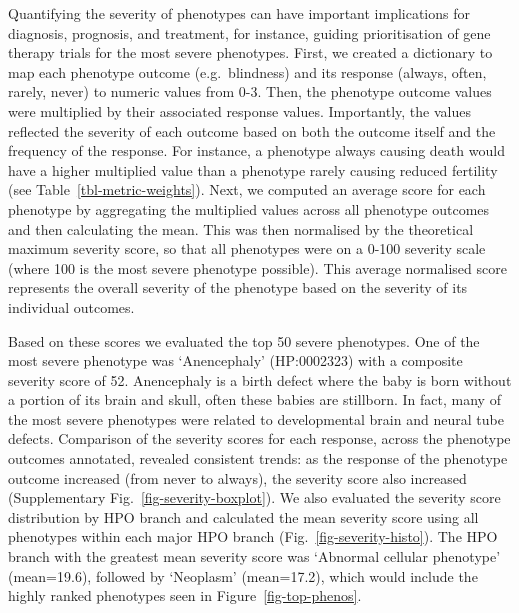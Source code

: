 \documentclass[
]{agujournal2019}
\begin{document}
Quantifying the severity of phenotypes can have important implications
for diagnosis, prognosis, and treatment, for instance, guiding
prioritisation of gene therapy trials for the most severe phenotypes.
First, we created a dictionary to map each phenotype outcome
(e.g.~blindness) and its response (always, often, rarely, never) to
numeric values from 0-3. Then, the phenotype outcome values were
multiplied by their associated response values. Importantly, the values
reflected the severity of each outcome based on both the outcome itself
and the frequency of the response. For instance, a phenotype always
causing death would have a higher multiplied value than a phenotype
rarely causing reduced fertility (see Table~\ref{tbl-metric-weights}).
Next, we computed an average score for each phenotype by aggregating the
multiplied values across all phenotype outcomes and then calculating the
mean. This was then normalised by the theoretical maximum severity
score, so that all phenotypes were on a 0-100 severity scale (where 100
is the most severe phenotype possible). This average normalised score
represents the overall severity of the phenotype based on the severity
of its individual outcomes.

Based on these scores we evaluated the top 50 severe phenotypes. One of
the most severe phenotype was `Anencephaly' (HP:0002323) with a
composite severity score of 52. Anencephaly is a birth defect where the
baby is born without a portion of its brain and skull, often these
babies are stillborn. In fact, many of the most severe phenotypes were
related to developmental brain and neural tube defects. Comparison of
the severity scores for each response, across the phenotype outcomes
annotated, revealed consistent trends: as the response of the phenotype
outcome increased (from never to always), the severity score also
increased (Supplementary Fig.~\ref{fig-severity-boxplot}). We also
evaluated the severity score distribution by HPO branch and calculated
the mean severity score using all phenotypes within each major HPO
branch (Fig.~\ref{fig-severity-histo}). The HPO branch with the greatest
mean severity score was `Abnormal cellular phenotype' (mean=19.6),
followed by `Neoplasm' (mean=17.2), which would include the highly
ranked phenotypes seen in Figure~\ref{fig-top-phenos}.
\end{document}

